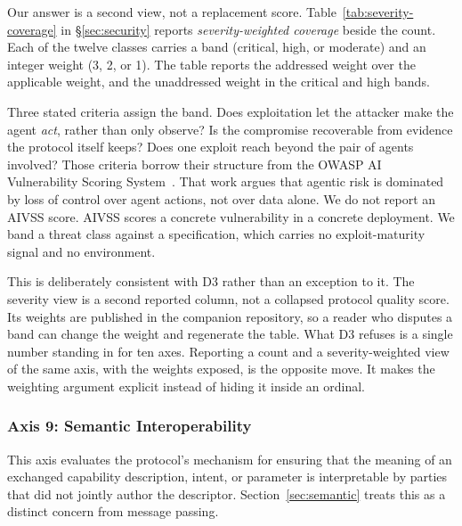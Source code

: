 Our answer is a second view, not a replacement score.
Table~\ref{tab:severity-coverage} in \S\ref{sec:security}
reports \emph{severity-weighted coverage} beside the count.
Each of the twelve classes carries a band (critical, high,
or moderate) and an integer weight (3, 2, or 1). The table
reports the addressed weight over the applicable weight,
and the unaddressed weight in the critical and high bands.

Three stated criteria assign the band. Does exploitation
let the attacker make the agent \emph{act}, rather than
only observe? Is the compromise recoverable from evidence
the protocol itself keeps? Does one exploit reach beyond
the pair of agents involved? Those criteria borrow their
structure from the OWASP AI Vulnerability Scoring
System~\cite{owasp_aivss}. That work argues that agentic
risk is dominated by loss of control over agent actions,
not over data alone. We do not report an AIVSS score.
AIVSS scores a concrete vulnerability in a concrete
deployment. We band a threat class against a
specification, which carries no exploit-maturity signal
and no environment.

This is deliberately consistent with D3 rather than an
exception to it. The severity view is a second reported
column, not a collapsed protocol quality score. Its
weights are published in the companion repository, so a
reader who disputes a band can change the weight and
regenerate the table. What D3 refuses is a single number
standing in for ten axes. Reporting a count and a
severity-weighted view of the same axis, with the weights
exposed, is the opposite move. It makes the weighting
argument explicit instead of hiding it inside an ordinal.

\subsubsection{Axis 9: Semantic Interoperability}
\label{sec:rubric:axis9}

This axis evaluates the protocol's mechanism for ensuring
that the meaning of an exchanged capability description,
intent, or parameter is interpretable by parties that did
not jointly author the descriptor. Section~\ref{sec:semantic}
treats this as a distinct concern from message passing.


